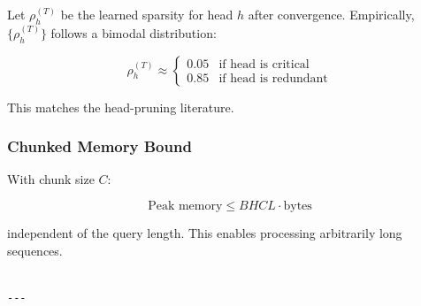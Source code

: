 Let $\rho_h^{(T)}$ be the learned sparsity for head $h$ after convergence. 
Empirically, $\{\rho_h^{(T)}\}$ follows a bimodal distribution:

\[
\rho_h^{(T)} \approx \begin{cases} 0.05 & \text{if head is critical} \\ 0.85 & \text{if head is redundant} \end{cases}
\]

This matches the head-pruning literature.

\subsubsection{Chunked Memory Bound}

With chunk size $C$:

\[
\text{Peak memory} \leq B H C L \cdot \text{bytes}
\]

independent of the query length. This enables processing arbitrarily long 
sequences.
\begin{lstlisting}

---
\end{lstlisting}